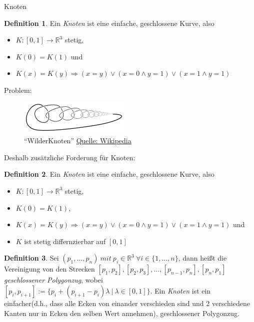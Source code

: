 \documentclass[a4paper,pagesizefontsize=12pt]{scrartcl}
\newcommand\R{\mathbb{R}}
\theoremstyle{definition}
\newtheorem{defi}{Definition}
\theoremstyle{remark}
\begin{document}
\begin{section}{Knoten}

\begin{defi}
Ein \textit{Knoten} ist eine einfache, geschlossene Kurve, also
\begin{itemize}
\item $K:[0,1] \longrightarrow \R^{3} $ stetig,
\item $K(0) = K(1)$ und
\item $K(x) =K(y) \Rightarrow (x=y)\vee(x=0 \wedge y=1)\vee(x=1 \wedge y=1)$
\end{itemize}
\end{defi}
\vspace{0.2cm}

Problem: 
\begin{figure}[H]
\center
\includegraphics[width=0.4\linewidth]{WilderKnoten}
\caption* {\enquote{WilderKnoten}  \href{http://de.wikipedia.org/wiki/Datei:Wild\_knot.svg}{Quelle: Wikipedia}}
\end{figure}
\vspace{0.2cm}

Deshalb zusätzliche Forderung für Knoten:
\begin{defi}
Ein \textit{Knoten} ist eine einfache, geschlossene Kurve, also
\begin{itemize}
\item $K:[0,1] \longrightarrow \R^{3} $ stetig,
\item $K(0) = K(1)$,
\item $K(x) =K(y) \Rightarrow (x=y)\vee(x=0 \wedge y=1)\vee(x=1 \wedge y=1)$ und
\item $K$ ist stetig differnzierbar auf $[0,1]$
\end{itemize}
\end{defi}

\begin{defi}
Sei $(p_1, \dots, p_n)\ mit\ p_i \in \R^3 \ \forall i\in \{1, \dots, n\}$, dann heißt die Vereinigung von den Strecken $[p_1, p_2], [p_2,p_3], \dots, [p_{n-1}, p_n], [p_n, p_1]$ \textit{geschlossener Polygonzug}, wobei \\ $[p_i,p_{i+1}] := \{p_i + (p_{i+1}-p_i)\lambda \  |\  \lambda \in [0,1]\}$.
Ein \textit{Knoten} ist ein einfacher(d.h., dass alle Ecken von einander verschieden sind und 2 verschiedene Kanten nur in Ecken den selben Wert annehmen), geschlossener Polygonzug.
\end{defi}


\end{section}
\end{document}
